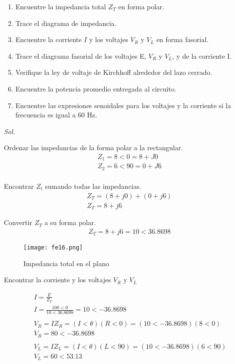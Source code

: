 \begin{enumerate}
	      \begin{enumerate}
		      \item Encuentre la impedancia total $Z_T$ en forma polar.
		      \item Trace el diagrama de impedancia.
		      \item Encuentre la corriente $I$ y los voltajes $V_R$ y $V_L$ en forma fasorial.
		      \item Trace el diagrama fasorial de los voltajes E, $V_R$ y $V_L$, y de la corriente I.
		      \item Verifique la ley de voltaje de Kirchhoff alrededor del lazo cerrado.
		      \item Encuentre la potencia promedio entregada al circuito.
		      \item Encuentre las expresiones senoidales para los voltajes y la corriente si la frecuencia es igual a 60 Hz.
	      \end{enumerate}


	      \textit{ Sol. }

	      Ordenar las impedancias de la forma polar a la rectangular.
	      \begin{align*}
		       & Z_1=8<0=8+J0  \\
		       & Z_2=6<90=0+J6 \\
	      \end{align*}

	      Encontrar $Z_t$ sumando todas las impedancias.
	      \begin{align*}
		       & Z_T=(8+j0)+(0+j6) \\
		       & Z_T=8+j6
	      \end{align*}

	      Convertir $Z_T$ a su forma polar.
	      \begin{align*}
		       & Z_T=8+j6=10<36.8698
	      \end{align*}

	      \begin{figure}[h!]
		      \centering
		      \texttt{[image: fe16.png]}
		      \caption{Impedancia total en el plano}
		      \label{f1}
	      \end{figure}

	      Encontrar la corriente y los voltajes $V_R$ y $V_L$

	      \begin{align*}
		       & I=\frac{E}{Z_T}                               \\
		       & I=\frac{100<0}{10<36.8698}= 10<-36.8698       \\\\\
		       & V_R=IZ_R=(I<\theta)(R<0)=(10<-36.8698)(8<0)   \\
		       & V_R=80<-36.8698                               \\\\
		       & V_L=IZ_L=(I<\theta)(L<90)=(10<-36.8698)(6<90) \\
		       & V_L=60<53.13
	      \end{align*}


\end{enumerate}
